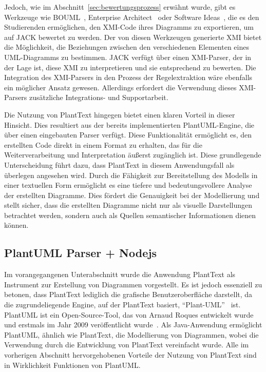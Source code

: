 Jedoch, wie im Abschnitt~\ref{sec:bewertungsprozess} erwähnt wurde, gibt es Werkzeuge wie BOUML~\cite{bouml},
Enterprise Architect~\cite{enterarch} oder Software Ideas~\cite{sim}, die es den Studierenden ermöglichen, den XMI-Code
ihres Diagramms zu exportieren, um auf JACK bewertet zu werden. Der von diesen Werkzeugen generierte XMI bietet die
Möglichkeit, die Beziehungen zwischen den verschiedenen Elementen eines UML-Diagramms zu bestimmen. JACK verfügt über
einen XMI-Parser, der in der Lage ist, diese XMI zu interpretieren und sie entsprechend zu bewerten. Die Integration des
XMI-Parsers in den Prozess der Regelextraktion wäre ebenfalls ein möglicher Ansatz gewesen. Allerdings erfordert die
Verwendung dieses XMI-Parsers zusätzliche Integrations- und Supportarbeit.


Die Nutzung von PlantText hingegen bietet einen klaren Vorteil in dieser Hinsicht. Dies resultiert aus der bereits
implementierten PlantUML-Engine, die über einen eingebauten Parser verfügt. Diese Funktionalität ermöglicht es,
den erstellten Code direkt in einem Format zu erhalten, das für die Weiterverarbeitung und Interpretation äußerst zugänglich ist.
Diese grundlegende Unterscheidung führt dazu, dass PlantText in diesem Anwendungsfall als überlegen angesehen wird.
Durch die Fähigkeit zur Bereitstellung des Modells in einer textuellen Form ermöglicht es eine tiefere und
bedeutungsvollere Analyse der erstellten Diagramme. Dies fördert die Genauigkeit bei der Modellierung und stellt sicher,
dass die erstellten Diagramme nicht nur als visuelle Darstellungen betrachtet werden, sondern auch als Quellen
semantischer Informationen dienen können.

\subsection{PlantUML Parser + Nodejs}

Im vorangegangenen Unterabschnitt wurde die Anwendung PlantText als Instrument zur Erstellung von Diagrammen
vorgestellt. Es ist jedoch essenziell zu betonen, dass PlantText lediglich die grafische Benutzeroberfläche darstellt,
da die zugrundeliegende Engine, auf der PlantText basiert, ``Plant-UML''~\cite{plantUML} ist. PlantUML ist ein Open-Source-Tool,
das von Arnaud Roques entwickelt wurde und erstmals im Jahr 2009 veröffentlicht wurde~\cite{plantUML}. Als Java-Anwendung
ermöglicht PlantUML, ähnlich wie PlantText, die Modellierung von Diagrammen, wobei die Verwendung durch die Entwicklung
von PlantText vereinfacht wurde. Alle im vorherigen Abschnitt hervorgehobenen Vorteile der Nutzung von PlantText sind in
Wirklichkeit Funktionen von PlantUML.

